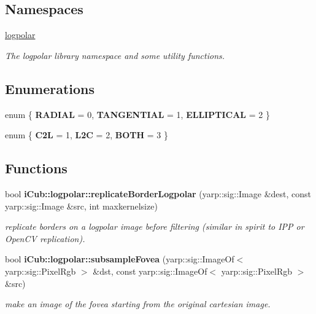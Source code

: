 \subsection*{Namespaces}
\begin{DoxyCompactItemize}
\item 
 \hyperlink{namespacelogpolar}{logpolar}
\begin{DoxyCompactList}\small\item\em The logpolar library namespace and some utility functions. \end{DoxyCompactList}\end{DoxyCompactItemize}
\subsection*{Enumerations}
\begin{DoxyCompactItemize}
\item 
enum \{ {\bfseries R\+A\+D\+I\+A\+L} = 0, 
{\bfseries T\+A\+N\+G\+E\+N\+T\+I\+A\+L} = 1, 
{\bfseries E\+L\+L\+I\+P\+T\+I\+C\+A\+L} = 2
 \}\label{namespaceiCub_1_1logpolar_a6756b64c44301a6ef09e3de7d3d2ae77}

\item 
enum \{ {\bfseries C2\+L} = 1, 
{\bfseries L2\+C} = 2, 
{\bfseries B\+O\+T\+H} = 3
 \}\label{namespaceiCub_1_1logpolar_a2d212a99632ec74ff18d7d6c01a18d7d}

\end{DoxyCompactItemize}
\subsection*{Functions}
\begin{DoxyCompactItemize}
\item 
bool {\bfseries i\+Cub\+::logpolar\+::replicate\+Border\+Logpolar} (yarp\+::sig\+::\+Image \&dest, const yarp\+::sig\+::\+Image \&src, int maxkernelsize)
\begin{DoxyCompactList}\small\item\em replicate borders on a logpolar image before filtering (similar in spirit to I\+P\+P or Open\+C\+V replication). \end{DoxyCompactList}\item 
bool {\bfseries i\+Cub\+::logpolar\+::subsample\+Fovea} (yarp\+::sig\+::\+Image\+Of$<$ yarp\+::sig\+::\+Pixel\+Rgb $>$ \&dst, const yarp\+::sig\+::\+Image\+Of$<$ yarp\+::sig\+::\+Pixel\+Rgb $>$ \&src)
\begin{DoxyCompactList}\small\item\em make an image of the fovea starting from the original cartesian image. \end{DoxyCompactList}\end{DoxyCompactItemize}
